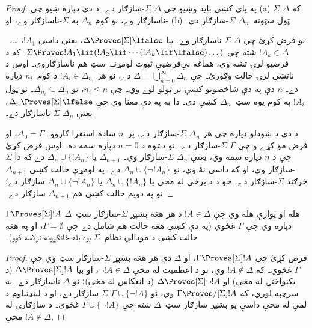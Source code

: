 \documentclass[../../../include/open-logic-section]{subfiles}
\begin{document}
\begin{proof}
په پای کښې بايد وښيو چې $\Delta$ $\Sigma$-سازګار دے۔ د دې دپاره
ښيو چې (a) که $\Delta$ $\Sigma$-ناسازګار وے، نو کوم $\Delta_n$
به $\Sigma$-ناسازګار وے، او (b) ټول سټونه~$\Delta_n$
$\Sigma$-سازګار دي۔

نو فرض کړئ چې $\Delta$ $\Sigma$-ناسازګار وے۔ بيا $\Delta
\Proves[\Sigma] \lfalse$، يعنې داسې $!A_1$، \dots،~$!A_k \in
\Delta$ شته چې $\Sigma \Proves !A_1 \lif (!A_2 \lif \cdots (!A_k
\lif \lfalse)\dots)$۔ که د فرضيو لړۍ تشه وي، هماغه بې‌فرضيې
ثبوت لومړنے سټ هم ناسازګاروي۔ اوس د ناتشې لړۍ حالت وګورئ۔
چې $\Delta = \bigcup_{n=0}^\infty \Delta_n$
دے، نو هر $!A_i \in \Delta_{n_i}$ د کوم~$n_i$ دپاره دے۔ $n$ دې
په دې شاخصونو کښې تر ټولو لوے وي۔ چې $n_i \le n$، نو
$\Delta_{n_i} \subseteq \Delta_n$۔ نو ټول $!A_i$ په کوم يوه
سټ~$\Delta_n$ کښې دي۔ دا به په دې معنا وي چې $\Delta_n
\Proves[\Sigma] \lfalse$، يعنې $\Delta_n$ $\Sigma$-ناسازګار دے۔

د دې د ښودلو دپاره چې هر $\Delta_n$ $\Sigma$-سازګار دے، پر~$n$
ساده استقرا کاروو۔ $\Delta_0 = \Gamma$، او فرض مو کړے و چې
$\Gamma$ $\Sigma$-سازګار دے۔ نو دعوه د $n = 0$ دپاره سمه ده۔
اوس فرض کړئ چې د $n$ دپاره سمه وي، يعنې $\Delta_n$
$\Sigma$-سازګار وي۔ $\Delta_{n+1}$ يا $\Delta_n \cup \{!A_n\}$
دے که دا $\Sigma$-سازګار وي، او که داسې نۀ وي، نو
$\Delta_n \cup \{\lnot!A_n\}$ دے۔ په لومړي حالت کښې
$\Delta_{n+1}$ څرګند $\Sigma$-سازګار دے۔ خو د
 د
 برخې له مخې يا $\Delta_n \cup \{!A_n\}$ يا
$\Delta_n \cup \{\lnot!A_n\}$ سازګار دے؛ نو په دويم حالت کښې هم
$\Delta_{n+1}$ سازګار دے۔
\end{proof}

\begin{cor}
  $\Gamma \Proves[\Sigma] !A$ هله او يوازې هله وي چې $!A \in \Delta$
  د هر هغه بشپړ $\Sigma$-سازګار سټ~$\Delta$ دپاره وي چې
  $\Gamma$ غځوي (په دې کښې هغه حالت هم شامل دے چې
  $\Gamma = \emptyset$، او په هغه حالت کښې د مودالي نظام~$\Sigma$
  يوه بله ځانګړونه ترلاسه کوو)۔
\end{cor}

\begin{proof}
  فرض کړئ چې $\Gamma \Proves[\Sigma] !A$، او $\Delta$ دې هر هغه
  بشپړ $\Sigma$-سازګار سټ وي چې $\Gamma$ غځوي۔ که $!A
  \notin \Delta$ وي، نو د اعظميت له مخې $\lnot!A \in \Delta$،
  او بيا $\Delta \Proves[\Sigma] !A$ (د يکنواختۍ له مخې) او
  $\Delta \Proves[\Sigma] \lnot!A$ (د انعکاس له مخې)؛ نو
  $\Delta$ ناسازګار دے۔ په سرچپه لوري، که
  $\Gamma \Proves/[\Sigma] !A$ وي، نو
  $\Gamma \cup \{ \lnot!A\}$ $\Sigma$-سازګار دے، او د لينډنباوم
  د لمې له مخې داسې يو بشپړ سازګار سټ~$\Delta$ شته چې
  $\Gamma \cup \{ \lnot!A \}$ غځوي۔ د سازګارۍ له مخې $!A
  \notin \Delta$.
\end{proof}
\end{document}
